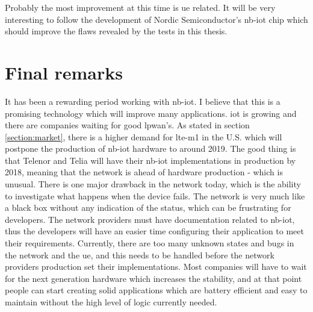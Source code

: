 \documentclass[USenglish]{ifimaster}  %
\begin{document}
Probably the most improvement at this time is \acrshort{ue} related. It will be very interesting to follow the development of Nordic Semiconductor's \acrshort{nb-iot} chip which should improve the flaws revealed by the tests in this thesis.

\section{Final remarks}
It has been a rewarding period working with \acrshort{nb-iot}. I believe that this is a promising technology which will improve many applications. \acrshort{iot} is growing and there are companies waiting for good \acrshort{lpwan}'s. As stated in section \vref{section:market}, there is a higher demand for \acrshort{lte-m1} in the U.S. which will postpone the production of \acrshort{nb-iot} hardware to around 2019. The good thing is that Telenor and Telia will have their \acrshort{nb-iot} implementations in production by 2018, meaning that the network is ahead of hardware production - which is unusual. There is one major drawback in the network today, which is the ability to investigate what happens when the device fails. The network is very much like a black box without any indication of the status, which can be frustrating for developers. The network providers must have documentation related to \acrshort{nb-iot}, thus the developers will have an easier time configuring their application to meet their requirements. Currently, there are too many unknown states and bugs in the network and the \acrshort{ue}, and this needs to be handled before the network providers production set their implementations. Most companies will have to wait for the next generation hardware which increases the stability, and at that point people can start creating solid applications which are battery efficient and easy to maintain without the high level of logic currently needed.

\backmatter{}
\printbibliography[]
\printglossary[type=\acronymtype]
\end{document}
